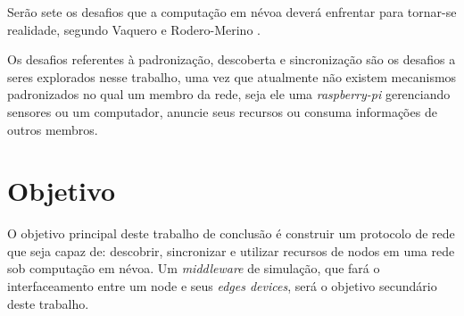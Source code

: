 Serão sete os desafios que a computação em névoa deverá enfrentar para tornar-se realidade, segundo Vaquero e Rodero-Merino \cite{Vaquero:2014}.

Os desafios referentes à padronização, descoberta e sincronização são os desafios a seres explorados nesse trabalho, uma vez que atualmente não existem mecanismos padronizados no qual um membro da rede, seja ele uma \textit{raspberry-pi} gerenciando sensores ou um computador, anuncie seus recursos ou consuma informações de outros membros.

\section{Objetivo}

O objetivo principal deste trabalho de conclusão é construir um protocolo de rede que seja capaz de: descobrir, sincronizar e utilizar recursos de nodos em uma rede sob computação em névoa.
Um \textit{middleware} de simulação, que fará o interfaceamento entre um node e seus \textit{edges devices}, será o objetivo secundário deste trabalho.






 
 
 
 
 
 
 
 









